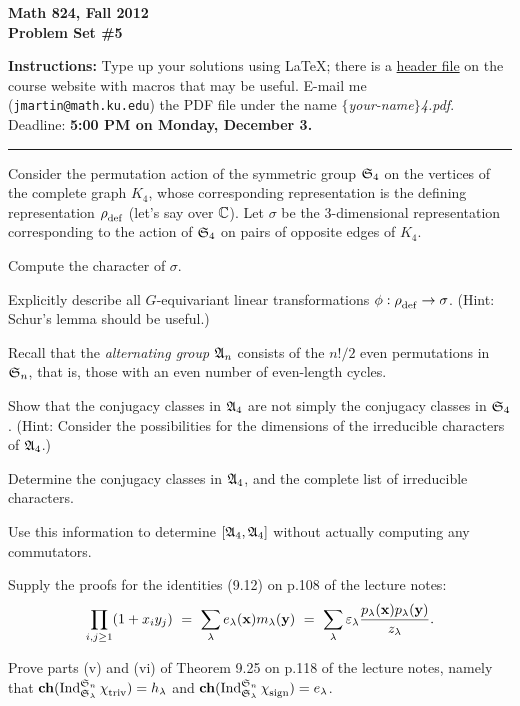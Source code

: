 

\thispagestyle{empty}
\bf Math 824, Fall 2012\\
Problem Set \#5\rm

{\bf Instructions:} Type up your solutions using LaTeX; there is a
\href{http://www.jlmartin.faculty.ku.edu/math824/header.tex}{header file}
on the course website with macros that may be useful.
E-mail me (\texttt{jmartin@math.ku.edu}) the PDF file under the name \textsl{$\{$your-name$\}$4.pdf}.  Deadline: {\bf 5:00 PM on Monday, December 3.}
\smallskip\hrule


\prob Consider the permutation action of the symmetric group $\mathfrak{S}_4$
on the vertices of the complete graph $K_4$, whose corresponding
representation is the defining representation $\rhodef$ (let's say
over $\mathbb{C}$).  Let $\sigma$ be the 3-dimensional representation
corresponding to the action of $\mathfrak{S}_4$ on pairs of opposite edges of
$K_4$.

\probpart Compute the character of $\sigma$.

\probpart Explicitly describe all $G$-equivariant linear transformations $\phi:\rhodef\to\sigma$.
(Hint: Schur's lemma should be useful.)

\bigskip%

\prob Recall that the \emph{alternating group} $\mathfrak{A}_n$ consists of the $n!/2$
even permutations in $\mathfrak{S}_n$, that is, those with an even number of even-length
cycles.

\probpart Show that the conjugacy classes in $\mathfrak{A}_4$ are not simply the conjugacy classes
in $\mathfrak{S}_4$.  (Hint: Consider the possibilities for the dimensions of the irreducible characters
of $\mathfrak{A}_4$.)

\probpart Determine the conjugacy classes in $\mathfrak{A}_4$, and the complete list of irreducible characters.

\probpart Use this information to determine $[\mathfrak{A}_4,\mathfrak{A}_4]$   
without actually computing any commutators.

\bigskip%

\prob Supply the proofs for the identities (9.12) on p.108 of the lecture notes:
$$\prod_{i,j\geq 1} (1+x_iy_j) ~=~ \sum_\lambda e_\lambda(\mathbf{x}) m_\lambda(\mathbf{y})
~=~ \sum_\lambda\varepsilon_\lambda \frac{p_\lambda(\mathbf{x}) p_\lambda(\mathbf{y})}{z_\lambda}.$$

\bigskip%

\prob Prove parts (v) and (vi) of Theorem 9.25 on p.118 of the lecture notes,
namely that $\ch(\Ind_{\Sym_\lambda}^{\Sym_n}\chitriv)=h_\lambda$
and $\ch(\Ind_{\Sym_\lambda}^{\Sym_n}\chisign)=e_\lambda$.

